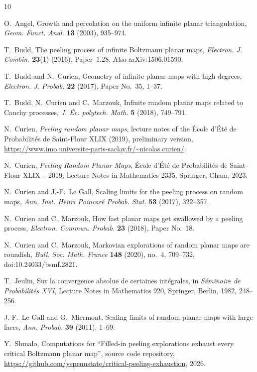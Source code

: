\documentclass[11pt]{amsart}
\theoremstyle{remark}
\numberwithin{equation}{section}
\newcommand{\1}{\mathbf 1}
\begin{document}
\begin{thebibliography}{10}

 O.~Angel, Growth and percolation on the uniform infinite planar triangulation, \emph{Geom. Funct. Anal.} \textbf{13} (2003), 935--974.

T.~Budd, The peeling process of infinite Boltzmann planar maps, \emph{Electron. J. Combin.} \textbf{23}(1) (2016), Paper~1.28. Also arXiv:1506.01590.

T.~Budd and N.~Curien, Geometry of infinite planar maps with high degrees, \emph{Electron. J. Probab.} \textbf{22} (2017), Paper No.~35, 1--37.

T.~Budd, N.~Curien and C.~Marzouk, Infinite random planar maps related to Cauchy processes, \emph{J. \'Ec. polytech. Math.} \textbf{5} (2018), 749--791.

N.~Curien, \emph{Peeling random planar maps}, lecture notes of the \'Ecole d'\'Et\'e de Probabilit\'es de Saint-Flour XLIX (2019), preliminary version, \url{https://www.imo.universite-paris-saclay.fr/~nicolas.curien/}.

N.~Curien, \emph{Peeling Random Planar Maps}, \'Ecole d'\'Et\'e de Probabilit\'es de Saint-Flour XLIX -- 2019, Lecture Notes in Mathematics 2335, Springer, Cham, 2023.

 N.~Curien and J.-F.~Le Gall, Scaling limits for the peeling process on random maps, \emph{Ann. Inst. Henri Poincar\'e Probab. Stat.} \textbf{53} (2017), 322--357.

 N.~Curien and C.~Marzouk, How fast planar maps get swallowed by a peeling process, \emph{Electron. Commun. Probab.} \textbf{23} (2018), Paper No.~18.

 N.~Curien and C.~Marzouk, Markovian explorations of random planar maps are roundish, \emph{Bull. Soc. Math. France} \textbf{148} (2020), no.~4, 709--732, doi:10.24033/bsmf.2821.

T.~Jeulin, Sur la convergence absolue de certaines int\'egrales, in \emph{S\'eminaire de Probabilit\'es XVI}, Lecture Notes in Mathematics 920, Springer, Berlin, 1982, 248--256.

J.-F.~Le Gall and G.~Miermont, Scaling limits of random planar maps with large faces, \emph{Ann. Probab.} \textbf{39} (2011), 1--69.

Y.~Shmalo, Computations for ``Filled-in peeling explorations exhaust every critical Boltzmann planar map'', source code repository, \url{https://github.com/yspennstate/critical-peeling-exhaustion}, 2026.


\end{thebibliography}
\end{document}
